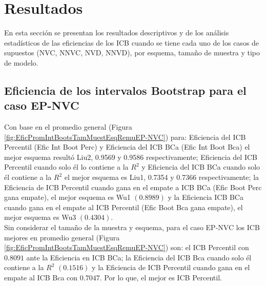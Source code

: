 \section{Resultados}
En esta sección se presentan los resultados descriptivos y de los análisis estadísticos de las eficiencias de los ICB cuando se tiene cada uno de los casos de supuestos (NVC, NNVC, NVD, NNVD), por esquema, tamaño de muestra y tipo de modelo.\\



\subsection{Eficiencia de los intervalos Bootstrap para el caso EP-NVC}
Con base en el promedio general (Figura \ref{fig:EficPromIntBootsTamMuestEsqRemuEP-NVC}) para: Eficiencia del ICB Percentil (Efic Int Boot Perc) y Eficiencia del ICB BCa (Efic Int Boot Bca) el mejor esquema resultó Liu2, 0.9569 y 0.9586 respectivamente;
Eficiencia del ICB Percentil cuando solo él lo contiene a la $R^{2}$ y Eficiencia del ICB BCa cuando solo él contiene a la $R^{2}$ el mejor esquema es Liu1, 0.7354 y 0.7366 respectivamente;
la Eficiencia de ICB Percentil cuando gana en el empate a ICB BCa (Efic Boot Perc gana empate), el mejor esquema es Wu1 $(0.8989)$ y la Eficiencia ICB BCa cuando gana en el empate al ICB Percentil (Efic Boot Bca gana empate), el mejor esquema es Wu3 $(0.4304)$.\\

Sin considerar el tamaño de la muestra y esquema, para el caso EP-NVC los ICB mejores en promedio general (Figura \ref{fig:EficPromIntBootsTamMuestEsqRemuEP-NVC}) son: el ICB Percentil con $0.8091$ ante la Eficiencia en ICB BCa; la Eficiencia del ICB Bca cuando solo él contiene a la $R^{2}$ $(0.1516)$ y la Eficiencia de ICB Percentil cuando gana en el empate al ICB Bca con $0.7047$. Por lo que, el mejor es ICB Percentil.\\


